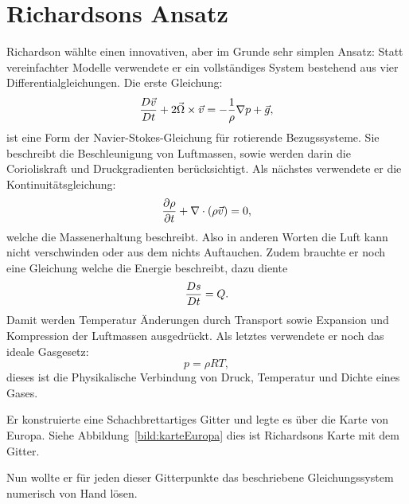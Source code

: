 %
%
%
%
\section{Richardsons Ansatz \label{geostrophisch:section:teil2}}

Richardson wählte einen innovativen, aber im Grunde sehr simplen Ansatz:  
Statt vereinfachter Modelle verwendete er ein vollständiges System bestehend aus vier Differentialgleichungen.
Die erste Gleichung:
\begin{equation}
	\frac{D\vec{v}}{Dt} + 2\vec{\Omega} \times \vec{v} = -\frac{1}{\rho}\nabla p + \vec{g} \\,
	\label{eq:navstok}
\end{equation}
ist eine Form der Navier-Stokes-Gleichung für rotierende Bezugssysteme.
Sie beschreibt die Beschleunigung von Luftmassen, sowie werden darin die Corioliskraft und Druckgradienten berücksichtigt.
Als nächstes verwendete er die Kontinuitätsgleichung:
\begin{equation}
	\frac{\partial \rho}{\partial t} + \nabla \cdot (\rho \vec{v}) = 0 \\,
	\label{eq:kont}
\end{equation}
welche die Massenerhaltung beschreibt.
Also in anderen Worten die Luft kann nicht verschwinden oder aus dem nichts Auftauchen. 
Zudem brauchte er noch eine Gleichung welche die Energie beschreibt, dazu diente 
\begin{equation}
	\frac{Ds}{Dt} = Q \\.
	\label{eq:enrgy}
\end{equation}
Damit werden Temperatur Änderungen durch Transport sowie Expansion und Kompression der Luftmassen ausgedrückt.
Als letztes verwendete er noch das ideale Gasgesetz:
\begin{equation}
	p = \rho R T,
	\label{eq:gasgesetz}
\end{equation}
dieses ist die Physikalische Verbindung von Druck, Temperatur und Dichte eines Gases.  

Er konstruierte eine Schachbrettartiges Gitter und legte es über die Karte von Europa.
Siehe Abbildung~\ref{bild:karteEuropa} dies ist Richardsons Karte mit dem Gitter. 

Nun wollte er für jeden dieser Gitterpunkte das beschriebene Gleichungssystem numerisch von Hand lösen. 

